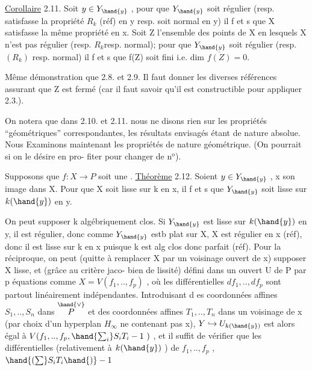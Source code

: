 
\uline{Corollaire} 2.11. Soit $y\in Y_{\hand{y}}$ , pour que $Y_{\hand{y}}$ soit régulier (resp. satisfasse la propriété
$R_k$ (réf) en y\hand{,} resp. soit normal en y) il f et s que X satisfasse
la même propriété en x.  Soit Z l'ensemble des points de X en
lesquels X n'est pas régulier (resp.  $R_k$resp.  normal); pour que $Y_{\hand{y}}$ soit
régulier (resp. $(R_k)$\hand{,} resp. normal) il f et s que f(Z) soit fini i.e. dim $\overline{f(Z)}=0$.

\placedmargin{|} Même démonstration que 2.8. et 2.9. Il faut donner les diverses
références assurant que Z est fermé (car il faut savoir qu'il est
constructible pour appliquer 2.3.).

 On notera que dans 2.10. et 2.11. nous ne disons rien
sur les propriétés ``géométriques'' correspondantes, les résultats
envisagés étant de nature absolue. Nous Examinons maintenant les
propriétés de nature géométrique. (On pourrait si on le désire en pro-%
\placedmargin{||}fiter pour changer de n$^{\text{o}}$).

Supposons que $f:X\to P$ soit une .
\uline{Théorème} 2.12. Soient $y\in Y_{\hand{y}}$ , x son image dans X. Pour que X soit
lisse sur k en x, il f et s que $Y_{\hand{y}}$ soit lisse sur $k(\hand{y})$ en y.

On peut supposer k algébriquement clos. Si $Y_{\hand{y}}$ est lisse sur $k(\hand{y})$
en y, il est régulier, donc comme $Y_{\hand{y}}$ estb plat sur X, X est régulier
en x (réf), donc il est lisse sur k en x puisque k est alg clos donc
parfait (réf). Pour la réciproque, on peut (quitte à remplacer X par
un voisinage ouvert de x) supposer X lisse, et (grâce au critère jaco-%
bien de lissité) défini dans un ouvert U de P par p équations
comme $X=V(f_1,..,f_p)$ , où les différentielles $df_1,..,df_p$ sont
partout linéairement indépendantes. Introduisant d es coordonnées affines
$S_1,..,S_n$ dans $\overset{\hand{\vee}}{P}$ et des coordonnées affines $T_1,..,T_n$ dans un voisinage
de x (par choix d'un hyperplan $H_\infty$ ne contenant pas x), $Y\hookrightarrow U_{k(\hand{y})}$ est
alors égal à $V(f_1,..,f_p,\hand{\sum_i}S_iT_i-1\ )$ , et il suffit de vérifier que
les différentielles (relativement à $k(\hand{y})$ ) de $f_1,..,f_p$ ,$\hand{(\sum}S_iT_i\hand{)}-1$

